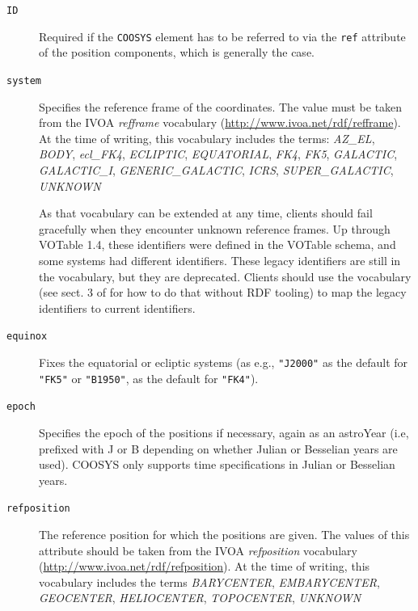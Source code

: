 \documentclass[11pt,a4paper]{ivoa}
\let\fg=\color
\def\attr#1{{\tt{\fg{DarkRed}#1}}}
\def\elem#1{{\tt{\fg{DarkRed}#1}}}
\begin{document}
\begin{description}
\item[\attr{ID}] Required if the \elem{COOSYS} element has to
be referred to via the \attr{ref} attribute of the position components,
which is generally the case.

\item[\attr{system}] Specifies the reference frame of the coordinates.
The value must be taken from the IVOA \emph{refframe} vocabulary
(\url{http://www.ivoa.net/rdf/refframe}).  At the time of writing, this
vocabulary includes the terms:
\textsl{AZ\_EL},
\textsl{BODY},
\textsl{ecl\_FK4},
\textsl{ECLIPTIC},
\textsl{EQUATORIAL},
\textsl{FK4},
\textsl{FK5},
\textsl{GALACTIC},
\textsl{GALACTIC\_I},
\textsl{GENERIC\_GALACTIC},
\textsl{ICRS},
\textsl{SUPER\_GALACTIC},
\textsl{UNKNOWN}

As that vocabulary can be extended at any time, clients should fail
gracefully when they encounter unknown reference frames.  Up through
VOTable 1.4, these identifiers were defined in the VOTable schema, and some
systems had different identifiers.  These legacy identifiers are still
in the vocabulary, but they are deprecated.  Clients should use the
vocabulary (see sect. 3 of \citet{2023ivoa.spec.0206D} for how to do
that without RDF tooling) to map the legacy identifiers to current
identifiers.

\item[\attr{equinox}] Fixes the
equatorial or ecliptic systems (as e.g., \verb|"J2000"| as the default
for \verb|"FK5"| or \verb|"B1950"|, as the default for
\verb|"FK4"|).

\item[\attr{epoch}] Specifies the epoch of the positions
if necessary, again as an astroYear (i.e, prefixed with J or B depending
on whether Julian or Besselian years are used).  COOSYS only supports time
specifications in Julian or Besselian years.

\item[\attr{refposition}] The reference position for which the positions
are given.  The values of this attribute should be taken from the IVOA
\emph{refposition} vocabulary (\url{http://www.ivoa.net/rdf/refposition}).
At the time of writing, this vocabulary includes the terms
\textsl{BARYCENTER},
\textsl{EMBARYCENTER},
\textsl{GEOCENTER},
\textsl{HELIOCENTER},
\textsl{TOPOCENTER},
\textsl{UNKNOWN}
\end{description}
\end{document}
